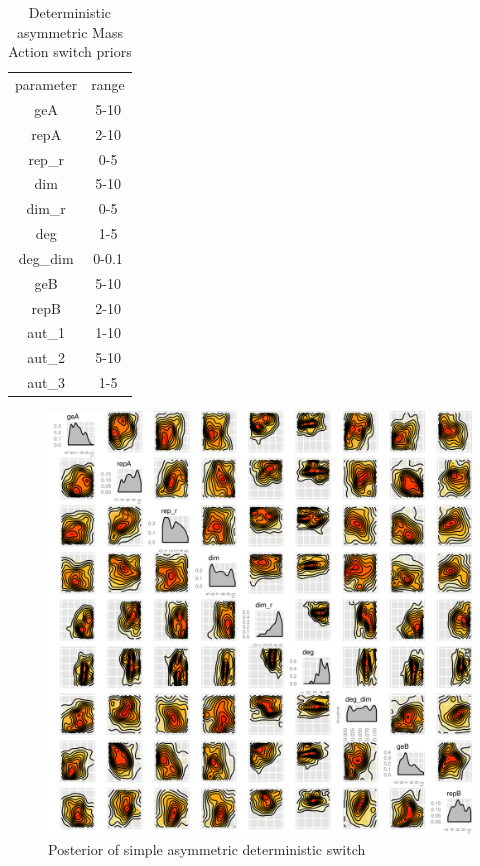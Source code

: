 \begin{table}[htbp]
\centering
\caption{Deterministic asymmetric Mass Action switch priors}
\label{tab:asym_cl_det_ma}
\begin{tabular}{cc}
parameter & range \\
geA & 5-10 \\
repA & 2-10 \\
rep\_r & 0-5 \\
dim & 5-10 \\
dim\_r & 0-5 \\
deg & 1-5 \\
deg\_dim & 0-0.1 \\
geB & 5-10 \\
repB & 2-10 \\
aut\_1 & 1-10\\
aut\_2 & 5-10\\
aut\_3 & 1-5\\
\end{tabular}
\end{table}

\begin{figure}[htbp]
\begin{center}
\includegraphics[scale=0.15]{chapterStabilityFinder/mass_action_switches/deterministic/asym/posterior_cl.png}
\caption{Posterior of simple asymmetric deterministic switch}\label{fig:asym_det_cl_ma_post}
\end{center}
\end{figure}

